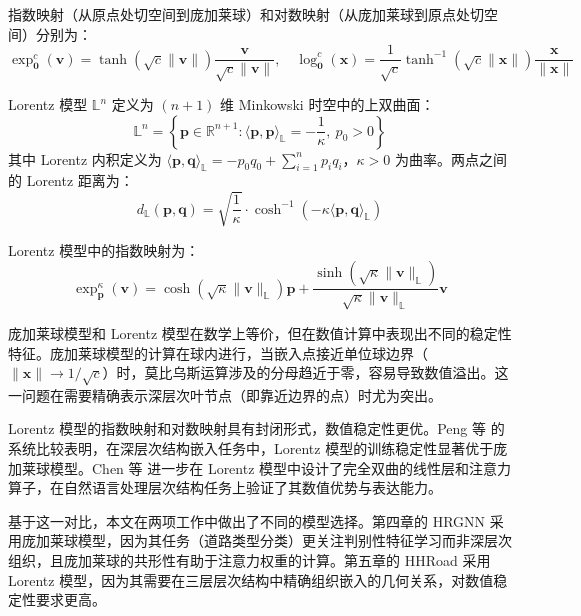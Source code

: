 指数映射（从原点处切空间到庞加莱球）和对数映射（从庞加莱球到原点处切空间）分别为：
\begin{equation}
    \exp_\mathbf{0}^c(\mathbf{v}) = \tanh\left(\sqrt{c}\|\mathbf{v}\|\right)\frac{\mathbf{v}}{\sqrt{c}\|\mathbf{v}\|}, \quad
    \log_\mathbf{0}^c(\mathbf{x}) = \frac{1}{\sqrt{c}}\tanh^{-1}(\sqrt{c}\|\mathbf{x}\|)\frac{\mathbf{x}}{\|\mathbf{x}\|}
\end{equation}

Lorentz 模型 $\mathbb{L}^n$ 定义为 $(n+1)$ 维 Minkowski 时空中的上双曲面：
\begin{equation}
    \mathbb{L}^n = \left\{\mathbf{p} \in \mathbb{R}^{n+1} : \langle \mathbf{p}, \mathbf{p} \rangle_{\mathbb{L}} = -\frac{1}{\kappa},\ p_0 > 0\right\}
\end{equation}
其中 Lorentz 内积定义为 $\langle \mathbf{p}, \mathbf{q} \rangle_{\mathbb{L}} = -p_0q_0 + \sum_{i=1}^n p_iq_i$，$\kappa > 0$ 为曲率。两点之间的 Lorentz 距离为：
\begin{equation}
    d_{\mathbb{L}}(\mathbf{p}, \mathbf{q}) = \sqrt{\frac{1}{\kappa}} \cdot \cosh^{-1}(-\kappa\langle \mathbf{p}, \mathbf{q} \rangle_{\mathbb{L}})
\end{equation}

Lorentz 模型中的指数映射为：
\begin{equation}
    \exp_{\mathbf{p}}^\kappa(\mathbf{v}) = \cosh(\sqrt{\kappa}\|\mathbf{v}\|_{\mathbb{L}})\mathbf{p} + \frac{\sinh(\sqrt{\kappa}\|\mathbf{v}\|_{\mathbb{L}})}{\sqrt{\kappa}\|\mathbf{v}\|_{\mathbb{L}}}\mathbf{v}
\end{equation}

庞加莱球模型和 Lorentz 模型在数学上等价，但在数值计算中表现出不同的稳定性特征。庞加莱球模型的计算在球内进行，当嵌入点接近单位球边界（$\|\mathbf{x}\| \to 1/\sqrt{c}$）时，莫比乌斯运算涉及的分母趋近于零，容易导致数值溢出。这一问题在需要精确表示深层次叶节点（即靠近边界的点）时尤为突出。

Lorentz 模型的指数映射和对数映射具有封闭形式，数值稳定性更优。Peng 等\cite{peng2022hyperbolic} 的系统比较表明，在深层次结构嵌入任务中，Lorentz 模型的训练稳定性显著优于庞加莱球模型。Chen 等\cite{chen2022fullyhyperbolic} 进一步在 Lorentz 模型中设计了完全双曲的线性层和注意力算子，在自然语言处理层次结构任务上验证了其数值优势与表达能力。

基于这一对比，本文在两项工作中做出了不同的模型选择。第四章的 HRGNN 采用庞加莱球模型，因为其任务（道路类型分类）更关注判别性特征学习而非深层次组织，且庞加莱球的共形性有助于注意力权重的计算。第五章的 HHRoad 采用 Lorentz 模型，因为其需要在三层层次结构中精确组织嵌入的几何关系，对数值稳定性要求更高。

